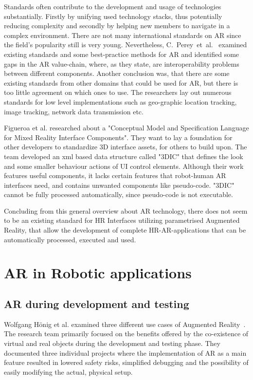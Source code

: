 Standards often contribute to the development and usage of technologies substantially. Firstly by unifying used technology stacks, thus potentially reducing complexity and secondly by helping new members to navigate in a complex environment. There are not many international standards on AR since the field's popularity still is very young. Nevertheless, C.~Perey~et~al.~\cite{perey2011current} examined existing standards and some best-practice methods for AR and identified some gaps in the AR value-chain, where, as they state, are interoperability problems between different components. Another conclusion was, that there are some existing standards from other domains that could be used for AR, but there is too little agreement on which ones to use. The researchers lay out numerous standards for low level implementations such as geo-graphic location tracking, image tracking, network data transmission etc.

Figueroa et al. \cite{figueroa2006conceptual} researched about a "Conceptual Model and Specification Language for Mixed Reality Interface Components". They want to lay a foundation for other developers to standardize 3D interface assets, for others to build upon. The team developed an xml based data structure called "3DIC" that defines the look and some smaller behaviour actions of UI control elements. Although their work features useful components, it lacks certain features that robot-human AR interfaces need, and contains unwanted components like pseudo-code. "3DIC" cannot be fully processed automatically, since pseudo-code is not executable. 

Concluding from this general overview about AR technology, there does not seem to be an existing standard for HR Interfaces utilizing parametrised Augmented Reality, that allow the development of complete HR-AR-applications that can be automatically processed, executed and used. 

\section{AR in Robotic applications}
\subsection{AR during development and testing}
Wolfgang Hönig et al. examined three different use cases of Augmented Reality~\cite{hoenig2015mixed}. The research team primarily focused on the benefits offered by the co-existence of virtual and real objects during the development and testing phase. They documented three individual projects where the implementation of AR as a main feature resulted in lowered safety risks, simplified debugging and the possibility of easily modifying the actual, physical setup.

